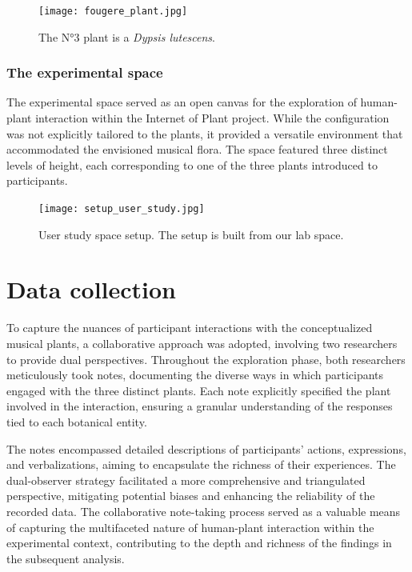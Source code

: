 \begin{figure}[h!]
    \centering
    \texttt{[image: fougere\_plant.jpg]}
    \caption{The N°3 plant is a \textit{Dypsis lutescens}.}
    
    \vspace{-0.5cm}
    \label{fig:fougere_plant}
    \vspace{0.2cm}
\end{figure}



\subsubsection{The experimental space}

The experimental space served as an open canvas for the exploration of human-plant interaction within the Internet of Plant project. While the configuration was not explicitly tailored to the plants, it provided a versatile environment that accommodated the envisioned musical flora. The space featured three distinct levels of height, each corresponding to one of the three plants introduced to participants. 

\begin{figure}[h]
    \centering
    \texttt{[image: setup\_user\_study.jpg]}
    \caption{User study space setup. The setup is built from our lab space.}
    
    \vspace{-0.5cm}
    \label{fig:setup_user_study}
    \vspace{0.2cm}
\end{figure}

\section{Data collection}
To capture the nuances of participant interactions with the conceptualized musical plants, a collaborative approach was adopted, involving two researchers to provide dual perspectives. Throughout the exploration phase, both researchers meticulously took notes, documenting the diverse ways in which participants engaged with the three distinct plants. Each note explicitly specified the plant involved in the interaction, ensuring a granular understanding of the responses tied to each botanical entity.

The notes encompassed detailed descriptions of participants' actions, expressions, and verbalizations, aiming to encapsulate the richness of their experiences. The dual-observer strategy facilitated a more comprehensive and triangulated perspective, mitigating potential biases and enhancing the reliability of the recorded data. The collaborative note-taking process served as a valuable means of capturing the multifaceted nature of human-plant interaction within the experimental context, contributing to the depth and richness of the findings in the subsequent analysis.

